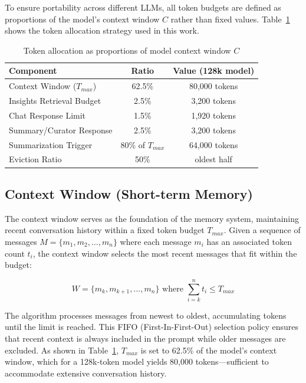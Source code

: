 \documentclass{article} %
\begin{document}
To ensure portability across different LLMs, all token budgets are defined as proportions of the model's context window $C$ rather than fixed values. Table~\ref{tab:token_allocation} shows the token allocation strategy used in this work.

\begin{table}[H]
\caption{Token allocation as proportions of model context window $C$}
\label{tab:token_allocation}
\begin{center}
\begin{tabular}{lcc}
\toprule
\textbf{Component} & \textbf{Ratio} & \textbf{Value (128k model)} \\
\midrule
Context Window ($T_{max}$) & 62.5\% & 80,000 tokens \\
Insights Retrieval Budget & 2.5\% & 3,200 tokens \\
Chat Response Limit & 1.5\% & 1,920 tokens \\
Summary/Curator Response & 2.5\% & 3,200 tokens \\
\midrule
Summarization Trigger & 80\% of $T_{max}$ & 64,000 tokens \\
Eviction Ratio & 50\% & oldest half \\
\bottomrule
\end{tabular}
\end{center}
\end{table}

\subsection{Context Window (Short-term Memory)}
\label{sec:context_window}

The context window serves as the foundation of the memory system, maintaining recent conversation history within a fixed token budget $T_{max}$. Given a sequence of messages $M = \{m_1, m_2, ..., m_n\}$ where each message $m_i$ has an associated token count $t_i$, the context window selects the most recent messages that fit within the budget:

$$W = \{m_k, m_{k+1}, ..., m_n\} \text{ where } \sum_{i=k}^{n} t_i \leq T_{max}$$

The algorithm processes messages from newest to oldest, accumulating tokens until the limit is reached. This FIFO (First-In-First-Out) selection policy ensures that recent context is always included in the prompt while older messages are excluded. As shown in Table~\ref{tab:token_allocation}, $T_{max}$ is set to 62.5\% of the model's context window, which for a 128k-token model yields 80,000 tokens---sufficient to accommodate extensive conversation history.
\end{document}
